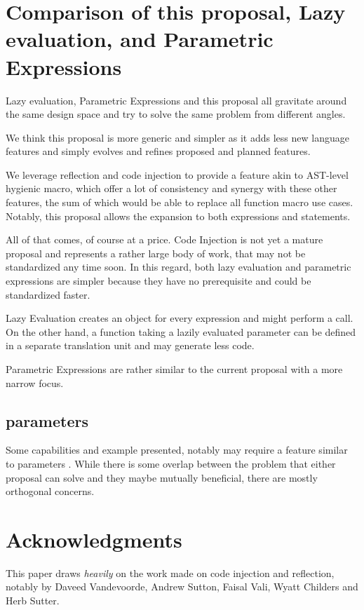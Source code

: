 \documentclass{wg21}
\begin{document}
\section{Comparison of this proposal, Lazy evaluation, and Parametric Expressions}

Lazy evaluation, Parametric Expressions and this proposal all gravitate around the same
design space and try to solve the same problem from different angles.

We think this proposal is more generic and simpler as it adds less new language features and simply evolves 
and refines proposed and planned features.

We leverage reflection and code injection to provide a feature akin to AST-level hygienic macro,
which offer a lot of consistency and synergy with these other features, the sum of which would be able
to replace all function macro use cases.
Notably, this proposal allows the expansion to both expressions and statements. 

All of that comes, of course at a price. Code Injection is not yet a mature proposal and represents a rather large body of work, that may not be standardized any time soon.
In this regard, both lazy evaluation and parametric expressions are simpler because they have no prerequisite and could be standardized faster.

Lazy Evaluation creates an object for every expression and might perform a call.
On the other hand, a function taking a lazily evaluated parameter can be defined in a separate translation
unit and may generate less code.

Parametric Expressions are rather similar to the current proposal with a more narrow focus.

\subsection{ parameters}

Some capabilities and example presented, notably  may require a
feature similar to  parameters \cite{P1045R1}.
While there is some overlap between the problem that either proposal can solve and they
maybe mutually beneficial, there are mostly orthogonal concerns.

\section{Acknowledgments}

This paper draws \emph{heavily} on the work made on code injection and reflection, notably by
Daveed Vandevoorde, Andrew Sutton, Faisal Vali, Wyatt Childers and Herb Sutter.



\end{document}
